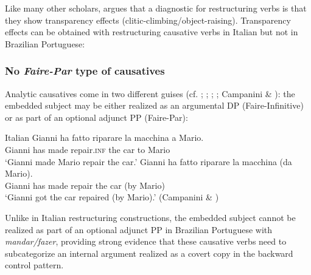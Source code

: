 \documentclass[output=paper]{langsci/langscibook}
\begin{document}
Like many other scholars, \citet{Cinque2004} argues that a diagnostic for restructuring verbs is that they show transparency effects (clitic-climbing/object-raising). Transparency effects can be obtained with restructuring causative verbs in Italian but not in Brazilian Portuguese:

\ea%
    \label{ex:moreno:17}
    \z
\z

\subsubsection{No \textit{Faire-Par} type of causatives} %

Analytic causatives come in two different guises (cf. \citealt{Kayne1975}; \citealt{Huber1980}; \citealt{Burzio1986}; \citealt{Enzinger2010}; Campanini \& \citealt{Pitteroff2012}): the embedded subject may be either realized as an argumental DP  (Faire-Infinitive) or as part of an optional adjunct PP (Faire-Par):

\ea%
         Italian\label{ex:moreno:18}
    \ea  
    \gll Gianni ha  fatto   riparare    la   macchina a Mario.\\
         Gianni has made repair.\textsc{inf} the car    to Mario \\
    \glt ‘Gianni made Mario repair the car.’
    \ex  
    \gll Gianni ha fatto    riparare   la  macchina   (da Mario). \\
         Gianni has made repair   the car  (by Mario) \\
    \glt ‘Gianni got the car repaired (by Mario).’ (Campanini \& \citealt{Pitteroff2012})
    \z
\z

Unlike in Italian restructuring constructions, the embedded subject cannot be realized as part of an optional adjunct PP in Brazilian Portuguese with \textit{mandar/fazer}, providing strong evidence that these causative verbs need to subcategorize an internal argument realized as a covert copy in the backward control pattern. 
\end{document}
